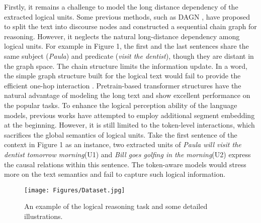 \documentclass[sigconf]{acmart}
\begin{document}
Firstly, it remains a challenge to model the long distance dependency 
\cite{hockett1947problems} of the extracted logical units. Some previous 
methods, such as DAGN \cite{huang2021dagn}, have proposed to split the text 
into discourse nodes \cite{xu2019discourse} and constructed a sequential chain 
graph for reasoning. However, it neglects the natural long-distance dependency 
among logical units. For example in Figure 1, the first and the last sentences 
share the same subject (\textit{Paula}) and predicate (\textit{visit the 
dentist}), though they are distant in the graph space. The chain structure 
limits the information update. In a word, the simple graph structure built for 
the logical text would fail to provide the efficient one-hop interaction 
\cite{salha2020simple}. Pretrain-based transformer structures 
\cite{vaswani2017attention} have the natural advantage of modeling the long 
text and show excellent performance on the popular tasks. To enhance the 
logical perception ability of the language models, previous works have 
attempted to employ additional segment embedding at the beginning. However, it 
is still limited to the token-level interactions, which sacrifices the global 
semantics of logical units. Take the first sentence of the context in Figure 1 
as an instance, two extracted units of \textit{Paula will visit the dentist 
tomorrow morning}(U1) and \textit{Bill goes golfing in the morning}(U2) express 
the causal relations within this sentence. The token-aware models would stress 
more on the text semantics and fail to capture such logical information.

\begin{figure}[t]
	\large
	\centering
	\texttt{[image: Figures/Dataset.jpg]}
	\caption{An example of the logical reasoning task and some detailed illustrations.}
	\label{fig_dataset}
	\vspace{-0.4cm}
\end{figure}
\end{document}
